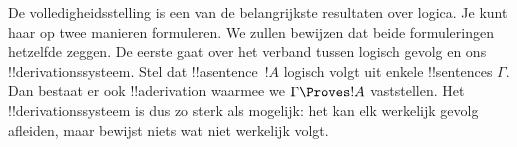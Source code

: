 \documentclass[openany]{memoir}
\begin{document}
      {}
      {}











\endgroup

\begingroup
\def\olfilename{OLP-0127}
\def\olfilepath{content/first-order-logic/completeness/}
\hypertarget{unit-OLP-0127}{}



      {}
      {}


De volledigheidsstelling is een van de belangrijkste resultaten over
logica. Je kunt haar op twee manieren formuleren. We zullen bewijzen
dat beide formuleringen hetzelfde zeggen. De eerste gaat over het
verband tussen logisch gevolg en ons !!{derivation}ssysteem. Stel dat
!!a{sentence}~$!A$ logisch volgt uit enkele !!{sentence}s $\Gamma$.
Dan bestaat er ook !!a{derivation} waarmee we
$\Gamma \Proves !A$ vaststellen. Het !!{derivation}ssysteem is dus zo
sterk als mogelijk: het kan elk werkelijk gevolg afleiden, maar bewijst
niets wat niet werkelijk volgt.
\end{document}
